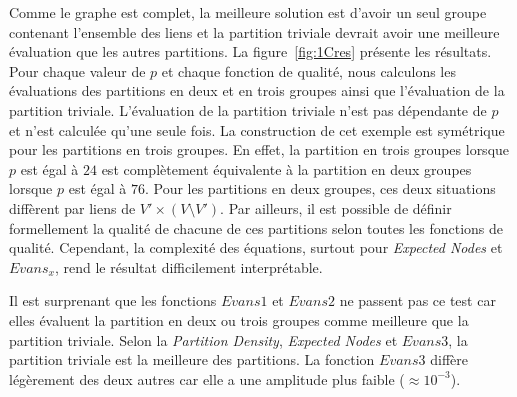 Comme le graphe est complet, la meilleure solution est d'avoir un seul groupe contenant l'ensemble des liens et la partition triviale devrait avoir une meilleure évaluation que les autres partitions.
La figure~\ref{fig:1Cres} présente les résultats.
Pour chaque valeur de $p$ et chaque fonction de qualité, nous calculons les évaluations des partitions en deux et en trois groupes ainsi que l'évaluation de la partition triviale.
L'évaluation de la partition triviale n'est pas dépendante de $p$ et n'est calculée qu'une seule fois.
La construction de cet exemple est symétrique pour les partitions en trois groupes.
En effet, la partition en trois groupes lorsque $p$ est égal à $24$ est complètement équivalente à la partition en deux groupes lorsque $p$ est égal à $76$.
Pour les partitions en deux groupes, ces deux situations diffèrent par liens de $V' \times (V\setminus V')$.
Par ailleurs, il est possible de définir formellement la qualité de chacune de ces partitions selon toutes les fonctions de qualité.
Cependant, la complexité des équations, surtout pour \emph{Expected Nodes} et $Evans_x$, rend le résultat difficilement interprétable.


Il est surprenant que les fonctions $Evans1$ et $Evans2$ ne passent pas ce test car elles évaluent la partition en deux ou trois groupes comme meilleure que la partition triviale.
Selon la \emph{Partition Density}, \emph{Expected Nodes} et $Evans3$, la partition triviale est la meilleure des partitions.
La fonction $Evans3$ diffère légèrement des deux autres car elle a une amplitude plus faible ($\approx 10^{-3}$).


